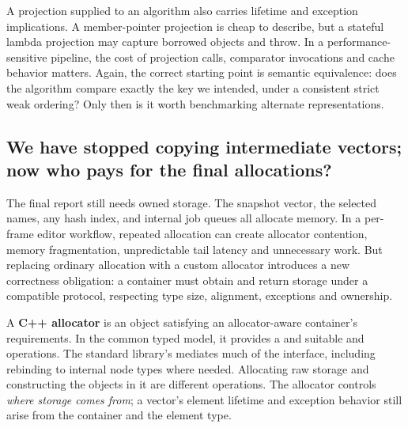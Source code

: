 A projection supplied to an algorithm also carries lifetime and exception implications. A member-pointer projection is cheap to describe, but a stateful lambda projection may capture borrowed objects and throw. In a performance-sensitive pipeline, the cost of projection calls, comparator invocations and cache behavior matters. Again, the correct starting point is semantic equivalence: does the algorithm compare exactly the key we intended, under a consistent strict weak ordering? Only then is it worth benchmarking alternate representations.

\subsection{We have stopped copying intermediate vectors; now who pays for the final allocations?}\label{01-foundations-i-ch006-we-have-stopped-copying-intermediate-vectors-now-who-pays-for-the-final-allocations}

\hypertarget{01-foundations-i-ch006-we-have-stopped-copying-intermediate-vectors-now-who-pays-for-the-final-allocations}{}

The final report still needs owned storage. The snapshot vector, the selected names, any hash index, and internal job queues all allocate memory. In a per-frame editor workflow, repeated allocation can create allocator contention, memory fragmentation, unpredictable tail latency and unnecessary work. But replacing ordinary allocation with a custom allocator introduces a new correctness obligation: a container must obtain and return storage under a compatible protocol, respecting type size, alignment, exceptions and ownership.

A \textbf{C++ allocator} is an object satisfying an allocator-aware container's requirements. In the common typed model, it provides a  and suitable  and  operations. The standard library's  mediates much of the interface, including rebinding to internal node types where needed. Allocating raw storage and constructing the objects in it are different operations. The allocator controls \emph{where storage comes from}; a vector's element lifetime and exception behavior still arise from the container and the element type.

